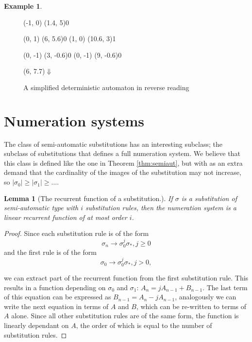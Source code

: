 \documentclass{article}
\newtheorem{lemma}[theorem]{Lemma}
\theoremstyle{definition}
\newtheorem{example}[theorem]{Example}
\begin{document}
\begin{example}
\begin{itemize}
\begin{figure}[H]
\begin{graph}
   
   

  (-1, 0) \freetext(1.4, 5){0}
   
   
   

   
   
  (0, 1) \freetext(6, 5.6){0}
   
   
  (1, 0) \freetext(10.6, 3){1}

  
  (0, -1) \freetext(3, -0.6){0}
   
  (0, -1) \freetext(9, -0.6){0}
   

  \freetext(6, 7.7){$\Downarrow$}
\end{graph}
\caption{A simplified deterministic automaton in reverse reading}
\label{fig:simpl_det_reverse}
\end{figure}
\end{itemize}
\end{example}

\section{Numeration systems}
The class of semi-automatic substitutions has an interesting subclass;
the subclass of substitutions that defines a full numeration system. We 
believe that this class
is defined like the one in Theorem \ref{thm:semiaut}, but with as an extra
demand that the cardinality of the images of the substitution may not increase,
so $|\sigma_0| \ge |\sigma_1| \ge \ldots$.

\begin{lemma}[The recurrent function of a substitution.]
If $\sigma$ is a substitution of semi-automatic type with $i$ substitution 
rules, then the numeration system is a linear recurrent function of at most 
order $i$.
\end{lemma}
\begin{proof}
Since each substitution rule is of the form 
\begin{displaymath}
\sigma_n \rightarrow \sigma_0^j \sigma_*, j \ge 0
\end{displaymath}
and the first rule is of the form
\begin{displaymath}
\sigma_0 \rightarrow \sigma_0^j \sigma_*, j > 0,
\end{displaymath}

we can extract part of the recurrent function from the first substitution rule.
This results in a function depending on $\sigma_0$ and 
$\sigma_1$: $A_n = j A_{n - 1} + B_{n - 1}$. The last term of this 
equation can be expressed as  $B_{n - 1} = A_n - j A_{n - 1}$, analogously we
can write the next equation in terms of $A$ and $B$, which can be re-written 
to terms of $A$ alone. Since all other substitution rules are of the same form,
the function is linearly dependant on $A$, the order of which is equal to the
number of substitution rules.
\end{proof}
\end{document}
